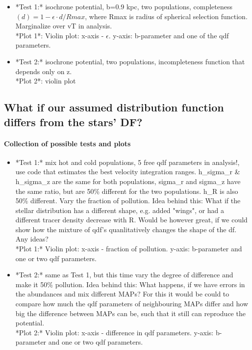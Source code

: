 \documentclass[12pt,preprint]{aastex}
\begin{document}
\begin{itemize}
\item  *Test 1:* isochrone potential, b=0.9 kpc, two populations, completeness$(d) = 1 - \epsilon \cdot d/Rmax$, where Rmax is radius of spherical selection function. Marginalize over vT in analysis. \\
*Plot 1*: Violin plot: x-axis - $\epsilon$. y-axis: b-parameter and one of the qdf parameters.
\item  *Test 2:* isochrone potential, two populations, incompleteness function that depends only on z. \\
*Plot 2*: violin plot
\end{itemize}

\subsection{What if our assumed distribution function differs from the stars' DF?}

\paragraph{Collection of possible tests and plots}

\begin{itemize}
\item *Test 1:* mix hot and cold populations, 5 free qdf parameters in analysis!, use code that estimates the best velocity integration ranges. h\_sigma\_r \& h\_sigma\_z are the same for both populations, sigma\_r and sigma\_z have the same ratio, but are 50\% different for the two populations. h\_R is also 50\% different. Vary the fraction of pollution. Idea behind this: What if the stellar distribution has a different shape, e.g. added "wings", or had a different tracer density decrease with R. Would be however great, if we could show how the mixture of qdf's quanlitatively changes the shape of the df. Any ideas? \\
*Plot 1:* Violin plot: x-axis - fraction of pollution. y-axis: b-parameter and one or two qdf parameters.
\item *Test 2:* same as Test 1, but this time vary the degree of difference and make it 50\% pollution. Idea behind this: What happens, if we have errors in the abundances and mix different MAPs? For this it would be could to compare how much the qdf parameters of neighbouring MAPs differ and how big the difference between MAPs can be, such that it still can reproduce the potential. \\
*Plot 2:* Violin plot: x-axis - difference in qdf parameters. y-axis: b-parameter and one or two qdf parameters.
\end{itemize}
\end{document}
